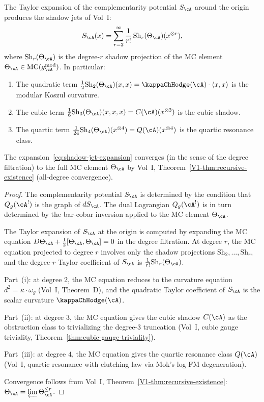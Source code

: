\begin{theorem}
The Taylor expansion of the complementarity potential $S_\cA$
around the origin produces the shadow jets of Vol~I:
\begin{equation}%
S_\cA(x) = \sum_{r=2}^{\infty} \frac{1}{r!}\,
\mathrm{Sh}_r(\Theta_\cA)(x^{\otimes r}),
\end{equation}
where $\mathrm{Sh}_r(\Theta_\cA)$ is the degree-$r$ shadow
projection of the MC element $\Theta_\cA \in \mathrm{MC}(g_\cA^{\mathrm{mod}})$.
In particular:
\begin{enumerate}[label=\textup{(\roman*)}]
\item The quadratic term
 $\frac{1}{2}\mathrm{Sh}_2(\Theta_\cA)(x, x)
 = \kappaChHodge(\cA) \cdot \langle x, x \rangle$
 is the modular Koszul curvature.
\item The cubic term
 $\frac{1}{6}\mathrm{Sh}_3(\Theta_\cA)(x, x, x)
 = C(\cA)(x^{\otimes 3})$
 is the cubic shadow.
\item The quartic term
 $\frac{1}{24}\mathrm{Sh}_4(\Theta_\cA)(x^{\otimes 4})
 = Q(\cA)(x^{\otimes 4})$
 is the quartic resonance class.
\end{enumerate}
The expansion~\eqref{eq:shadow-jet-expansion} converges
(in the sense of the degree filtration) to the full
MC element $\Theta_\cA$ by Vol~I,
Theorem~\textup{\ref*{V1-thm:recursive-existence}}
(all-degree convergence).
\end{theorem}

\begin{proof}
The complementarity potential $S_\cA$ is determined by the
condition that $Q_g(\cA^!)$ is the graph of $dS_\cA$.
The dual Lagrangian $Q_g(\cA^!)$ is in turn determined by
the bar-cobar inversion applied to the MC element $\Theta_\cA$.

The Taylor expansion of $S_\cA$ at the origin is computed by
expanding the MC equation
$D \Theta_\cA + \frac{1}{2}[\Theta_\cA, \Theta_\cA] = 0$
in the degree filtration.
At degree $r$, the MC equation projected to degree $r$ involves
only the shadow projections
$\mathrm{Sh}_2, \dots, \mathrm{Sh}_r$, and the degree-$r$
Taylor coefficient of $S_\cA$ is
$\frac{1}{r!}\mathrm{Sh}_r(\Theta_\cA)$.

Part~(i): at degree $2$, the MC equation reduces to the
curvature equation $d^2 = \kappa \cdot \omega_g$
(Vol~I, Theorem~D), and the quadratic Taylor coefficient
of $S_\cA$ is the scalar curvature $\kappaChHodge(\cA)$.

Part~(ii): at degree $3$, the MC equation gives the cubic
shadow $C(\cA)$ as the obstruction class to trivializing the
degree-$3$ truncation (Vol~I, cubic gauge triviality,
Theorem~\ref*{thm:cubic-gauge-triviality}).

Part~(iii): at degree $4$, the MC equation gives the quartic
resonance class $Q(\cA)$ (Vol~I, quartic resonance with
clutching law via Mok's log FM degeneration).

Convergence follows from Vol~I,
Theorem~\ref*{V1-thm:recursive-existence}:
$\Theta_\cA = \varprojlim \Theta_\cA^{\leq r}$.
\end{proof}


